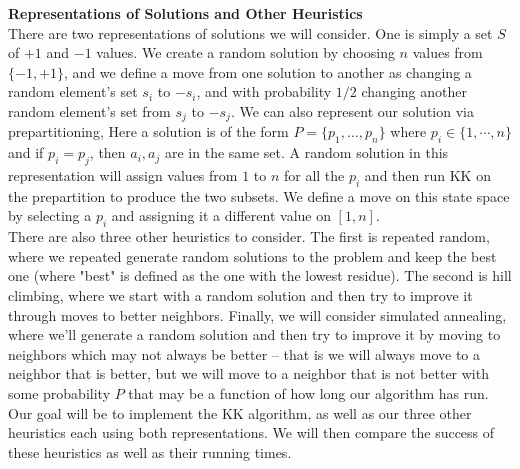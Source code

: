 \documentclass[12pt]{article}
\begin{document}
\textbf{Representations of Solutions and Other Heuristics} \\
There are two representations of solutions we will consider. One is simply a set $S$ of $+1$ and $-1$ values. We create a random solution by choosing $n$ values from $\{-1, +1\}$, and we define a move from one solution to another as changing a random element's set $s_i$ to $-s_i$, and with probability $1/2$ changing another random element's set from $s_j$ to $-s_j$. We can also represent our solution via prepartitioning, Here a solution is of the form $P = \{p_1, \dots, p_n\}$ where $p_i \in \{1, \cdots, n\}$ and if $p_i = p_j$, then $a_i, a_j$ are in the same set. A random solution in this representation will assign values from $1$ to $n$ for all the $p_i$ and then run KK on the prepartition to produce the two subsets. We define a move on this state space by selecting a $p_i$ and assigning it a different value on $[1, n]$. \\

There are also three other heuristics to consider. The first is repeated random, where we repeated generate random solutions to the problem and keep the best one (where "best" is defined as the one with the lowest residue). The second is hill climbing, where we start with a random solution and then try to improve it through moves to better neighbors. Finally, we will consider simulated annealing, where we'll generate a random solution and then try to improve it by moving to neighbors which may not always be better -- that is we will always move to a neighbor that is better, but we will move to a neighbor that is not better with some probability $P$ that may be a function of how long our algorithm has run. \\

Our goal will be to implement the KK algorithm, as well as our three other heuristics each using both representations. We will then compare the success of these heuristics as well as their running times. \\
\end{document}
